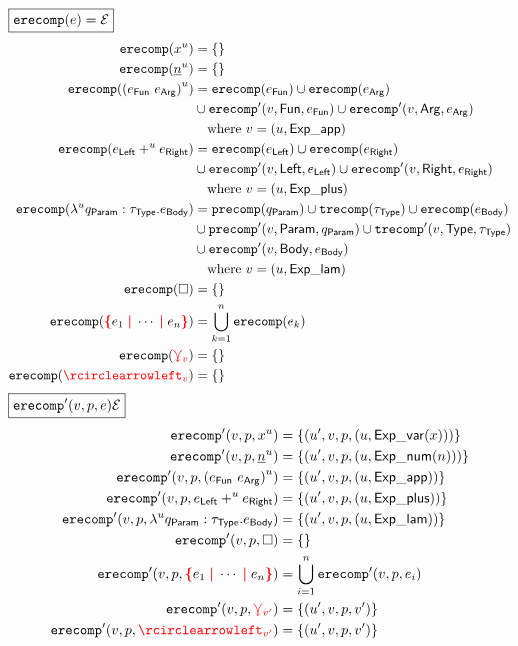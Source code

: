 \noindent $\boxed{\operatorname{\texttt{erecomp}}\mathopen{}\left(e\right)\mathclose{} = \mathcal{E}}$
%
\begin{align*}
  \erecomp{\varExp{x}{u}} &= \SetOf{}
  \\
  \erecomp{\numExp{n}{u}} &= \SetOf{}
  \\
  \erecomp{\appExp{e_\AppFun}{e_\AppArg}{u}}
  &= \erecomp{e_\AppFun}
  \cup \erecomp{e_\AppArg} \\
  &\cup \erecompPrime{v}{\AppFun}{e_\AppFun}
  \cup \erecompPrime{v}{\AppArg}{e_\AppArg} \\
  &\quad\text{where } v = (u, \ExpApp)
  \\
  \erecomp{\plusExp{e_\PlusLeft}{u}{e_\PlusRight}}
  &= \erecomp{e_\PlusLeft}
  \cup \erecomp{e_\PlusRight} \\
  &\cup \erecompPrime{v}{\PlusLeft}{e_\PlusLeft}
  \cup \erecompPrime{v}{\PlusRight}{e_\PlusRight} \\
  &\quad\text{where } v = (u, \ExpPlus)
  \\
  \erecomp{\lamExp{u}{q_\LamParam}{\tau_\LamType}{e_\LamBody}}
  &= \precomp{q_\LamParam}
  \cup \trecomp{\tau_\LamType}
  \cup \erecomp{e_\LamBody} \\
  &\cup \precompPrime{v}{\LamParam}{q_\LamParam}
  \cup \trecompPrime{v}{\LamType}{\tau_\LamType} \\
  &\cup \erecompPrime{v}{\LamBody}{e_\LamBody} \\
  &\quad\text{where } v = (u, \ExpLam)
  \\
  \erecomp{\hole} &= \SetOf{}
  \\
  \erecomp{\conflictHole{e_1, \cdots, e_n}}
  &= \bigcup_{k=1}^n \erecomp{e_k}
  \\
  \erecomp{\multiVertex{v}} &= \SetOf{}
  \\
  \erecomp{\cycleVertex{v}} &= \SetOf{}
\end{align*}
%
$\boxed{\operatorname{\operatorname{\texttt{erecomp}}^\prime}\mathopen{}\left(v, p, e\right)\mathclose{}  \mathcal{E}}$
%
\begin{align*}
  \erecompPrime{v}{p}{\varExp{x}{u}}
  &= \SetOf{(u', v, p, (u, \ExpVar(x)))}
  \\
  \erecompPrime{v}{p}{\numExp{n}{u}}
  &= \SetOf{(u', v, p, (u, \ExpNum(n)))}
  \\
  \erecompPrime{v}{p}{\appExp{e_\AppFun}{e_\AppArg}{u}}
  &= \SetOf{(u', v, p, (u, \ExpApp))}
  \\
  \erecompPrime{v}{p}{\plusExp{e_\PlusLeft}{u} {e_\PlusRight}}
  &= \SetOf{(u', v, p, (u, \ExpPlus))}
  \\
  \erecompPrime{v}{p}{\lamExp{u}{q_\LamParam}{\tau_\LamType}{e_\LamBody}}
  &= \SetOf{(u', v, p, (u, \ExpLam))}
  \\
  \erecompPrime{v}{p}{\hole} &= \SetOf{}
  \\
  \erecompPrime{v}{p}{\conflictHole{e_1, \cdots, e_n}}
  &= \bigcup_{i=1}^n \erecompPrime{v}{p}{e_i}
  \\
  \erecompPrime{v}{p}{\multiVertex{v'}}
  &= \SetOf{(u', v, p, v')}
  \\
  \erecompPrime{v}{p}{\cycleVertex{v'}}
  &= \SetOf{(u', v, p, v')}
\end{align*}
